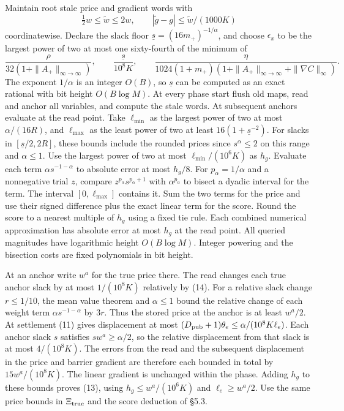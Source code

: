 \documentclass[11pt]{article}
\begin{document}
Maintain root stale price and gradient words with
\[
       \tfrac12 w\le\widetilde w\le 2 w,\qquad |\widetilde g-g|\le \widetilde w/(1000K)
\tag{13}
\]
coordinatewise. Declare the slack floor \(\underline s=(16m_+)^{-1/\alpha}\), and choose \(\epsilon_x\) to be the largest power of two at most one sixty-fourth of the minimum of
\[
 \frac{\rho}{32(1+\|A_+\|_{\infty\to\infty})},\qquad
 \frac{\underline s}{10^8K},\qquad
 \frac{\eta}{1024(1+m_+)(1+\|A_+\|_{\infty\to\infty}+\|\nabla C\|_\infty)}.
\tag{14}
\]
The exponent \(1/\alpha\) is an integer \(O(B)\), so \(\underline s\) can be computed as an exact rational with bit height \(O(B\log M)\). At every phase start flush old maps, read and anchor all variables, and compute the stale words. At subsequent anchors evaluate at the read point. Take \(\ell_{\min}\) as the largest power of two at most \(\alpha/(16R)\), and \(\ell_{\max}\) as the least power of two at least \(16(1+\underline s^{-2})\). For slacks in \([\underline s/2,2R]\), these bounds include the rounded prices since \(s^\alpha\le2\) on this range and \(\alpha\le1\). Use the largest power of two at most \(\ell_{\min}/(10^6 K)\) as \(h_g\). Evaluate each term \(\alpha s^{-1-\alpha}\) to absolute error at most \(h_g/8\). For \(p_\alpha=1/\alpha\) and a nonnegative trial \(z\), compare \(z^{p_\alpha}s^{p_\alpha+1}\) with \(\alpha^{p_\alpha}\) to bisect a dyadic interval for the term. The interval \([0,\ell_{\max}]\) contains it. Sum the two terms for the price and use their signed difference plus the exact linear term for the score. Round the score to a nearest multiple of \(h_g\) using a fixed tie rule. Each combined numerical approximation has absolute error at most \(h_g\) at the read point. All queried magnitudes have logarithmic height \(O(B\log M)\). Integer powering and the bisection costs are fixed polynomials in bit height.

At an anchor write \(w^a\) for the true price there. The read changes each true anchor slack by at most \(1/(10^8 K)\) relatively by (14). For a relative slack change \(r\le1/10\), the mean value theorem and \(\alpha\le1\) bound the relative change of each weight term \(\alpha s^{-1-\alpha}\) by \(3r\). Thus the stored price at the anchor is at least \(w^a/2\). At settlement (11) gives displacement at most \((D_{\rm pub}+1)\theta_e\le\alpha/(10^8K\ell_e)\). Each anchor slack \(s\) satisfies \(s w^a\ge\alpha/2\), so the relative displacement from that slack is at most \(4/(10^8K)\). The errors from the read and the subsequent displacement in the price and barrier gradient are therefore each bounded in total by \(15 w^a/(10^8K)\). The linear gradient is unchanged within the phase. Adding \(h_g\) to these bounds proves (13), using \(h_g\le w^a/(10^6 K)\) and \(\ell_e\ge w^a/2\). Use the same price bounds in \(\Xi_{\rm true}\) and the score deduction of §5.3.
\end{document}
